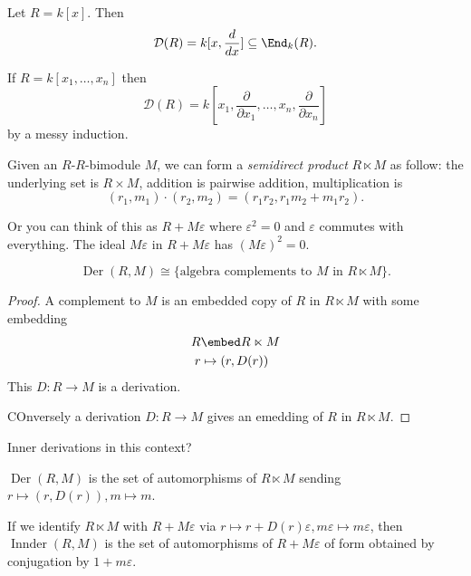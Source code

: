 \documentclass[a4paper]{article}
\DeclareMathOperator{\Der}{Der}
\DeclareMathOperator{\Innder}{Innder}
\begin{document}
\begin{eg}
  Let \(R = k[x]\). Then
  \[
    \mathcal D(R) = k[x, \frac{d}{dx}] \subseteq \End_k(R).
  \]

  If \(R = k[x_1, \dots, x_n]\) then
  \[
    \mathcal D(R) = k[x_1, \frac{\partial  }{\partial x_1}, \dots, x_n, \frac{\partial  }{\partial x_n}]
  \]
  by a messy induction.
\end{eg}

\begin{definition}
  Given an \(R\)-\(R\)-bimodule \(M\), we can form a \emph{semidirect product} \(R \ltimes M\) as follow: the underlying set is \(R \times M\), addition is pairwise addition, multiplication is
  \[
    (r_1, m_1) \cdot (r_2, m_2) = (r_1r_2, r_1m_2 + m_1r_2).
  \]
\end{definition}

Or you can think of this as \(R + M\varepsilon\) where \(\varepsilon^2 = 0\) and \(\varepsilon\) commutes with everything. The ideal \(M\varepsilon\) in \(R + M\varepsilon\) has \((M\varepsilon)^2 = 0\).

\begin{lemma}
  \[
    \Der(R, M) \cong \{\text{algebra complements to \(M\) in } R \ltimes M\}.
  \]
\end{lemma}

\begin{proof}
  A complement to \(M\) is an embedded copy of \(R\) in \(R \ltimes M\) with some embedding
  \begin{align*}
    R &\embed R \ltimes M \\
    r &\mapsto (r, D(r))
  \end{align*}
  This \(D: R \to M\) is a derivation.

  COnversely a derivation \(D: R \to M\) gives an emedding of \(R\) in \(R \ltimes M\).
\end{proof}

Inner derivations in this context?

\begin{corollary}
  \(\Der(R, M)\) is the set of automorphisms of \(R \ltimes M\) sending \(r \mapsto (r, D(r)), m \mapsto m\).

  If we identify \(R \ltimes M\) with \(R + M\varepsilon\) via \(r \mapsto r + D(r)\varepsilon, m\varepsilon \mapsto m\varepsilon\), then \(\Innder(R, M)\) is the set of automorphisms of \(R + M\varepsilon\) of form obtained by conjugation by \(1 + m\varepsilon\).
\end{corollary}


\printindex
\end{document}
